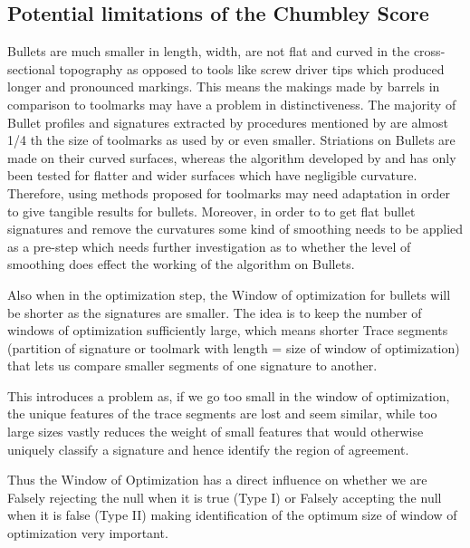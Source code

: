 \documentclass[12pt]{article}
\begin{document}
\subsection{Potential limitations of the Chumbley
Score}\label{potential-limitations-of-the-chumbley-score}


Bullets are much smaller in length, width, are not flat and curved in
the cross-sectional topography as opposed to tools like screw driver
tips which produced longer and pronounced markings. This means the
makings made by barrels in comparison to toolmarks may have a problem in
distinctiveness. The majority of Bullet profiles and signatures
extracted by procedures mentioned by \citet{aoas} are almost 1/4 th the
size of toolmarks as used by \citet{chumbley} or even smaller.
Striations on Bullets are made on their curved surfaces, whereas the
algorithm developed by \citet{chumbley} and \citet{hadler} has only been
tested for flatter and wider surfaces which have negligible curvature.
Therefore, using methods proposed for toolmarks may need adaptation in
order to give tangible results for bullets. Moreover, in order to to get
flat bullet signatures and remove the curvatures some kind of smoothing
needs to be applied as a pre-step which needs further investigation as
to whether the level of smoothing does effect the working of the
algorithm on Bullets.

Also when in the optimization step, the Window of optimization for
bullets will be shorter as the signatures are smaller. The idea is to
keep the number of windows of optimization sufficiently large, which
means shorter Trace segments (partition of signature or toolmark with
length = size of window of optimization) that lets us compare smaller
segments of one signature to another.

This introduces a problem as, if we go too small in the window of
optimization, the unique features of the trace segments are lost and
seem similar, while too large sizes vastly reduces the weight of small
features that would otherwise uniquely classify a signature and hence
identify the region of agreement.

Thus the Window of Optimization has a direct influence on whether we are
Falsely rejecting the null when it is true (Type I) or Falsely accepting
the null when it is false (Type II) making identification of the optimum
size of window of optimization very important.
\end{document}
